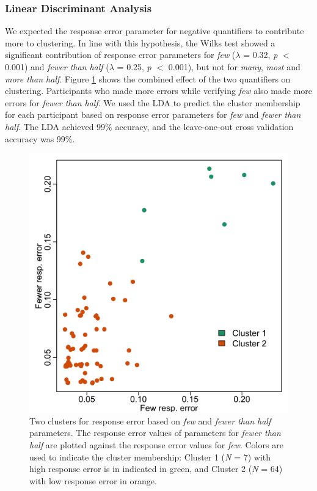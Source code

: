 \documentclass{article}
\begin{document}
\subsubsection{Linear Discriminant Analysis}
We expected the response error parameter for negative quantifiers to contribute more to clustering. In line with this hypothesis, the Wilks test showed a significant contribution of response error parameters for \textit{few} ($\lambda$ = 0.32, \textit{p} $<$ 0.001) and \textit{fewer than half} ($\lambda$ = 0.25, \textit{p} $<$ 0.001), but not for \textit{many}, \textit{most} and \textit{more than half}. Figure \ref{fig:fig2.10} shows the combined effect of the two quantifiers on clustering. Participants who made more errors while verifying \textit{few} also made more errors for \textit{fewer than half}. We used the LDA to predict the cluster membership for each participant based on response error parameters for \textit{few} and \textit{fewer than half}. The LDA achieved 99\% accuracy, and the leave-one-out cross validation accuracy was 99\%.

\begin{figure} [H]
    \centering
    \includegraphics[scale=0.2]{Figure2.10.png}
    \caption{Two clusters for response error based on \textit{few} and \textit{fewer than half} parameters. The response error values of parameters for \textit{fewer than half} are plotted against the response error values for \textit{few}. Colors are used to indicate the cluster membership: Cluster 1 (\textit{N} = 7) with high response error is in indicated in green, and Cluster 2 (\textit{N} = 64) with low response error in orange.}
    \label{fig:fig2.10}
\end{figure}
\end{document}
